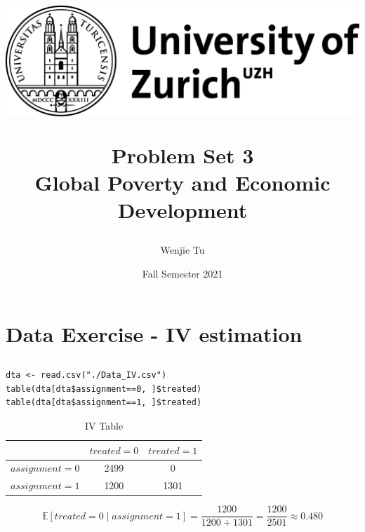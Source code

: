 \documentclass[a4paper]{article}
\title{%
\begin{center}
    \includegraphics[scale=0.15]{UZH2.png}
\end{center}
    Problem Set 3 \\
    \vspace{1mm}
    \large Global Poverty and Economic Development
}
\author{Wenjie Tu}
\date{Fall Semester 2021}
\begin{document}
\maketitle

\section{Data Exercise - IV estimation}

\subsection{} %



\begin{verbatim}
dta <- read.csv("./Data_IV.csv")
table(dta[dta$assignment==0, ]$treated)
table(dta[dta$assignment==1, ]$treated)
\end{verbatim}

\begin{table}[!htbp] \centering
    \caption{IV Table}
    \label{tab:counts}
    \vspace{1mm}
    \begin{tabular}{lcc}
    \hline\hline
    \vspace{1mm}
           & $treated=0$ & $treated=1$ \\
    \hline
    $assignment=0$ & 2499 &  0   \\
    $assignment=1$ & 1200 & 1301 \\
    \hline\hline
    \end{tabular}
\end{table}

\begin{equation*}
    \mathbb{E}[treated=0\mid assignment=1]=
    \frac{1200}{1200+1301}=\frac{1200}{2501}\approx0.480
\end{equation*}
\end{document}
